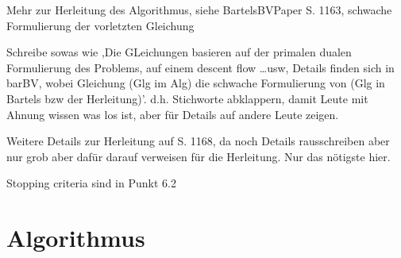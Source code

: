 
Mehr zur Herleitung des Algorithmus, siehe BartelsBVPaper S. 1163, schwache
Formulierung der vorletzten Gleichung

Schreibe sowas wie ,Die GLeichungen basieren auf der primalen dualen
Formulierung des Problems, auf einem descent flow \ldots usw,
Details finden sich in barBV, wobei Gleichung (Glg im Alg) die schwache
Formulierung von (Glg in Bartels bzw der Herleitung)'. d.h. Stichworte
abklappern, damit Leute mit Ahnung wissen was los ist, aber für Details
auf andere Leute zeigen.

Weitere Details zur Herleitung auf S. 1168, da noch Details rausschreiben
aber nur grob aber dafür darauf verweisen für die Herleitung. Nur das 
nötigste hier.


Stopping criteria sind in Punkt 6.2




\section{Algorithmus}

